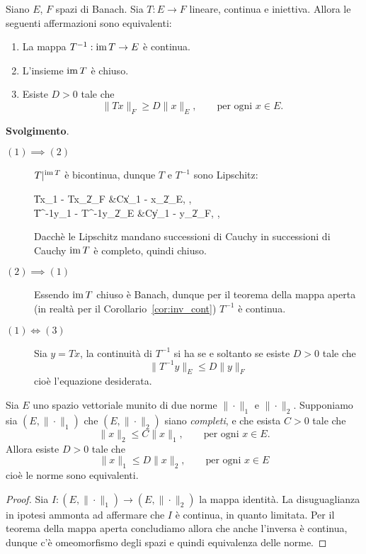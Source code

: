 \begin{exercise}
	Siano $E$, $F$ spazi di Banach. Sia $T:E \to F$ lineare, continua e iniettiva.
	Allora le seguenti affermazioni sono equivalenti:
	\begin{enumerate}
		\item La mappa $T^{-1} : \operatorname{im} T \to E$ è continua.
		\item L'insieme $\operatorname{im} T$ è chiuso.
		\item Esiste $D > 0$ tale che
		\begin{equation*}
			\|Tx\|_F \geq D\|x\|_E, \qquad \text{per ogni $x \in E$}.
		\end{equation*}
	\end{enumerate}

	\textbf{Svolgimento}.
	\begin{description}
		\item[$(1) \implies (2)$] $T\vert^{\operatorname{im} T}$ è bicontinua, dunque $T$ e $T^{-1}$ sono Lipschitz:
		\begin{eqalign*}
			\|Tx_1 - Tx_2\|_F &\leq C\|x_1 - x_2\|_E, \qquad {},\\
			\|T^{-1}y_1 - T^{-1}y_2\|_E &\leq C\|y_1 - y_2\|_F, \qquad {},\\
		\end{eqalign*}
		Dacchè le Lipschitz mandano successioni di Cauchy in successioni di Cauchy $\operatorname{im} T$ è completo, quindi chiuso.
		\item[$(2) \implies (1)$] Essendo $\operatorname{im} T$ chiuso è Banach, dunque per il teorema della mappa aperta (in realtà per il Corollario~\ref{cor:inv_cont}) $T^{-1}$ è continua.
		\item[$(1) \iff (3)$] Sia $y=Tx$, la continuità di $T^{-1}$ si ha se e soltanto se esiste $D > 0$ tale che
		\begin{equation*}
			\|T^{-1}y\|_E \leq D\|y\|_F
		\end{equation*}
		cioè l'equazione desiderata.
	\end{description}
\end{exercise}

\begin{corollary}
\label{cor:equiv_norm}
	Sia $E$ uno spazio vettoriale munito di due norme $\|\cdot\|_1$ e $\|\cdot\|_2$. Supponiamo sia $(E, \|\cdot\|_1)$ che $(E, \|\cdot\|_2)$ siano \emph{completi}, e che esista $C > 0$ tale che
	\begin{equation*}
		\|x\|_2 \leq C\|x\|_1, \qquad \text{per ogni $x \in E$}.
	\end{equation*}
	Allora esiste $D > 0$ tale che
	\begin{equation*}
		\|x\|_1 \leq D \|x\|_2, \qquad \text{per ogni $x \in E$}
	\end{equation*}
	cioè le norme sono equivalenti.
\end{corollary}
\begin{proof}
	Sia $I : (E, \|\cdot\|_1) \to (E, \|\cdot\|_2)$ la mappa identità. La disuguaglianza in ipotesi ammonta ad affermare che $I$ è continua, in quanto limitata. Per il teorema della mappa aperta concludiamo allora che anche l'inversa è continua, dunque c'è omeomorfismo degli spazi e quindi equivalenza delle norme.
\end{proof}


